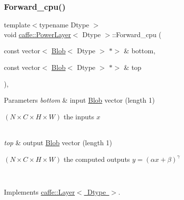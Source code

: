\mbox{\label{classcaffe_1_1_power_layer_a3f0196eab7b1f374a4705426d42b0711}} 
\subsubsection{\texorpdfstring{Forward\+\_\+cpu()}{Forward\_cpu()}\hspace{0.1cm}{\footnotesize\ttfamily [2/2]}}
{\footnotesize\ttfamily template$<$typename Dtype $>$ \\
void \mbox{\hyperlink{classcaffe_1_1_power_layer}{caffe\+::\+Power\+Layer}}$<$ Dtype $>$\+::Forward\+\_\+cpu (\begin{DoxyParamCaption}\item[{const vector$<$ \mbox{\hyperlink{classcaffe_1_1_blob}{Blob}}$<$ Dtype $>$ $\ast$$>$ \&}]{bottom,  }\item[{const vector$<$ \mbox{\hyperlink{classcaffe_1_1_blob}{Blob}}$<$ Dtype $>$ $\ast$$>$ \&}]{top }\end{DoxyParamCaption})\hspace{0.3cm}{\ttfamily [protected]}, {\ttfamily [virtual]}}


\begin{DoxyParams}{Parameters}
{\em bottom} & input \mbox{\hyperlink{classcaffe_1_1_blob}{Blob}} vector (length 1)
\begin{DoxyEnumerate}
\item $ (N \times C \times H \times W) $ the inputs $ x $ 
\end{DoxyEnumerate}\\
\hline
{\em top} & output \mbox{\hyperlink{classcaffe_1_1_blob}{Blob}} vector (length 1)
\begin{DoxyEnumerate}
\item $ (N \times C \times H \times W) $ the computed outputs $ y = (\alpha x + \beta) ^ \gamma $ 
\end{DoxyEnumerate}\\
\hline
\end{DoxyParams}


Implements \mbox{\hyperlink{classcaffe_1_1_layer_a576ac6a60b1e99fe383831f52a6cea77}{caffe\+::\+Layer$<$ Dtype $>$}}.

\mbox{\label{classcaffe_1_1_power_layer_a954ad3da9a5fd54665de1181b6165796}} 
